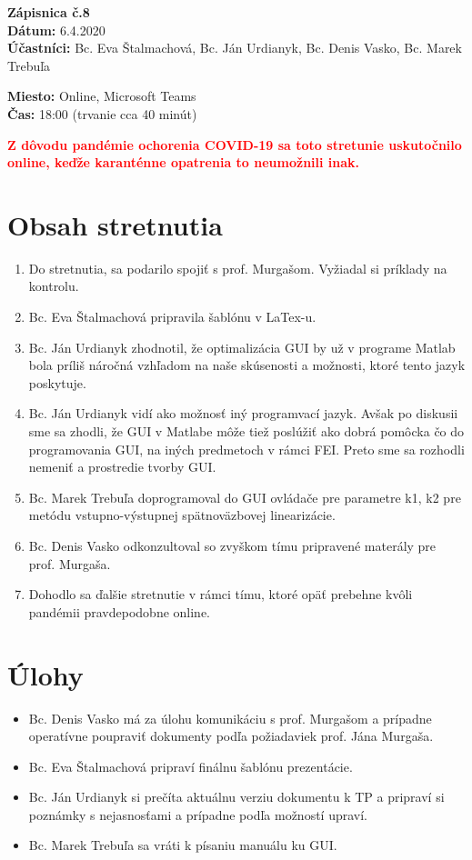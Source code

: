 
\usepackage{parskip}%
\usepackage[dvipsnames]{xcolor}

	\textbf{{\Huge Zápisnica č.8}}\\
			
	\textbf{Dátum:} 6.4.2020\\	
		
	\textbf{Účastníci:} Bc. Eva Štalmachová, Bc. Ján Urdianyk, Bc. Denis Vasko, Bc. Marek Trebuľa

	\textbf{Miesto:} Online, Microsoft Teams\\	
	
	\textbf{Čas:} 18:00 (trvanie cca 40 minút)
	
	\textbf{\textcolor{red}{Z dôvodu pandémie ochorenia COVID-19 sa toto stretunie uskutočnilo online, keďže karanténne opatrenia to neumožnili inak.}}   
    \section*{Obsah stretnutia}
    \begin{enumerate}
    	\item Do stretnutia, sa podarilo spojiť s prof. Murgašom. Vyžiadal si príklady na kontrolu.
    	\item Bc. Eva Štalmachová pripravila šablónu v LaTex-u.
    	\item Bc. Ján Urdianyk zhodnotil, že optimalizácia GUI by už v programe Matlab bola príliš náročná vzhľadom na naše skúsenosti a možnosti, ktoré tento jazyk poskytuje.
    	\item Bc. Ján Urdianyk  vidí ako možnosť iný programvací jazyk. Avšak po diskusii sme sa zhodli, že GUI v Matlabe môže tiež poslúžiť ako dobrá pomôcka čo do programovania GUI, na iných predmetoch v rámci FEI. Preto sme sa rozhodli nemeniť a prostredie tvorby GUI.
    	\item Bc. Marek Trebuľa doprogramoval do GUI ovládače pre parametre k1, k2 pre metódu vstupno-výstupnej spätnoväzbovej linearizácie.
    	\item Bc. Denis Vasko odkonzultoval so zvyškom tímu pripravené materály pre prof. Murgaša. 
    	\item Dohodlo sa ďalšie stretnutie v rámci tímu, ktoré opäť prebehne kvôli pandémii pravdepodobne online.
    \end{enumerate}    
    \section*{Úlohy}
    \begin{itemize}
    	\item Bc. Denis Vasko má za úlohu komunikáciu s prof. Murgašom a prípadne operatívne poupraviť dokumenty podľa požiadaviek prof. Jána Murgaša.
    	\item Bc. Eva Štalmachová pripraví finálnu šablónu prezentácie.
    	\item Bc. Ján Urdianyk si prečíta aktuálnu verziu dokumentu k TP a pripraví si poznámky s nejasnosťami a prípadne podľa možností upraví.
    	\item Bc. Marek Trebuľa sa vráti k písaniu manuálu ku GUI. 
    \end{itemize}

